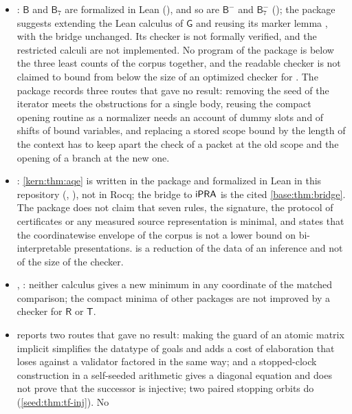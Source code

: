 \begin{itemize}
 and the single introduction together, is formalized in Lean
 (, generically over ).
\item {}: $\mathsf{B}$ and $\mathsf{B}_{7}$ are
 formalized in Lean (), and so are
 $\mathsf{B}^{-}$ and $\mathsf{B}^{-}_{7}$ (); the package
 suggests extending the Lean calculus  of $\mathsf{G}$ and reusing its marker
 lemma , with the bridge unchanged.  Its checker is not
 formally verified, and the restricted calculi are not implemented.  No
 program of the package is below the three least counts of the corpus
 together, and the readable checker is not claimed to bound from below the
 size of an optimized checker for .  The package records
 three routes that gave no result: removing the seed of the iterator meets
 the obstructions for a single body, reusing the compact opening routine as
 a normalizer needs an account of dummy slots and of shifts of bound
 variables, and replacing a stored scope bound by the length of the context
 has to keep apart the check of a packet at the old scope and the opening of
 a branch at the new one.
\item {}: \cref{kern:thm:aqe} is written in
 the package and formalized in Lean in this repository
 (, ), not in Rocq; the
 bridge to $\mathsf{iPRA}$ is the cited \cref{base:thm:bridge}.  The package does
 not claim that seven rules, the signature, the protocol of certificates or
 any measured source representation is minimal, and states that the
 coordinatewise envelope of the corpus is not a lower bound on
 bi-interpretable presentations.   is a reduction of the data
 of an inference and not of the size of the checker.
\item {}, : neither calculus gives
 a new minimum in any coordinate of the matched comparison; the compact
 minima of other packages are not improved by a checker for $\mathsf{R}$ or
 $\mathsf{T}$.
\item {} reports two routes that gave no result: making
 the guard of an atomic matrix implicit simplifies the datatype of goals
 and adds a cost of elaboration that loses against a validator factored in
 the same way; and a stopped-clock construction in a self-seeded arithmetic
 gives a diagonal equation and does not prove that the successor is
 injective; two paired stopping orbits do (\cref{seed:thm:tf-inj}).  No

\end{itemize}
